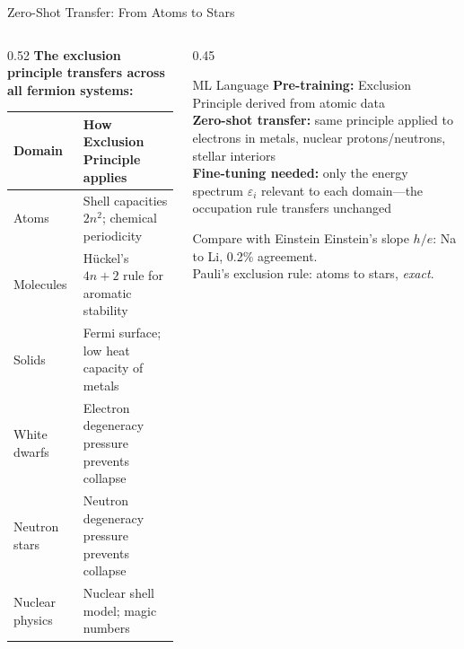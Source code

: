 \documentclass[aspectratio=169,12pt]{beamer}
\begin{document}
\begin{frame}[shrink=15]{Zero-Shot Transfer: From Atoms to Stars}

\begin{columns}[T]
\begin{column}{0.52\textwidth}
\textbf{The exclusion principle transfers across all fermion systems:}

\medskip
\begin{tabular}{p{2.2cm}p{5.5cm}}
\toprule
Domain & How Exclusion Principle applies \\
\midrule
Atoms & Shell capacities $2n^2$; chemical periodicity \\
Molecules & Hückel's $4n+2$ rule for aromatic stability \\
Solids & Fermi surface; low heat capacity of metals \\
White dwarfs & Electron degeneracy pressure prevents collapse \\
Neutron stars & Neutron degeneracy pressure prevents collapse \\
Nuclear physics & Nuclear shell model; magic numbers \\
\bottomrule
\end{tabular}
\end{column}
\begin{column}{0.45\textwidth}
\begin{alertblock}{ML Language}
\textbf{Pre-training:} Exclusion Principle
derived from atomic data\\[4pt]
\textbf{Zero-shot transfer:} same principle
applied to electrons in metals, nuclear
protons/neutrons, stellar interiors\\[4pt]
\textbf{Fine-tuning needed:} only the
energy spectrum $\varepsilon_i$ relevant to
each domain---the occupation rule
transfers unchanged
\end{alertblock}

\bigskip
\begin{block}{Compare with Einstein}
Einstein's slope $h/e$: Na to Li,
0.2\% agreement.\\
Pauli's exclusion rule: atoms to stars,
\emph{exact}.
\end{block}
\end{column}
\end{columns}

\end{frame}
\end{document}
